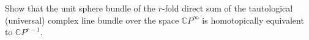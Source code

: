 Show that the unit sphere bundle of the $r$-fold direct sum of the tautological (universal) complex line bundle over the space $\mathbb{C}P^{\infty}$ is homotopically equivalent to $\mathbb{C}P^{r-1}$.